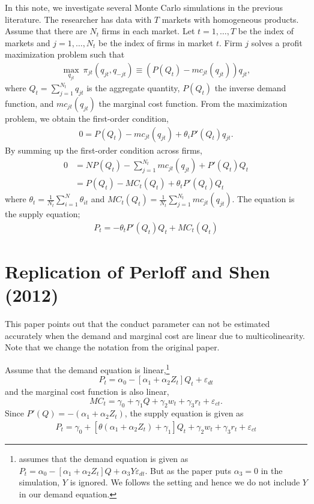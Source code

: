 \documentclass[11pt, a4paper]{article}
\numberwithin{figure}{section}
\theoremstyle{definition}
\newcommand{\0}{\mathbf{0}}
\begin{document}
In this note, we investigate several Monte Carlo simulations in the previous literature.
The researcher has data with $T$ markets with homogeneous products.
Assume that there are $N_t$ firms in each market.
Let $t = 1,\ldots, T$ be the index of markets and $j = 1, \ldots, N_t$ be the index of firms in market $t$.
Firm $j$ solves a profit maximization problem such that
\begin{align*}
    \max_{q_{jt}} \ \pi_{jt}(q_{jt}, q_{-jt}) \equiv (P(Q_t) - mc_{jt}(q_{jt}))q_{jt},
\end{align*}
where $Q_t = \sum_{j = 1}^{N_t} q_{jt}$ is the aggregate quantity, $P(Q_t)$ the inverse demand function, and $mc_{jt}(q_{jt})$ the marginal cost function.
From the maximization problem, we obtain the first-order condition,
\begin{align*}
    0 = P(Q_{t}) - mc_{jt}(q_{jt}) + \theta_i P'(Q_{t})q_{jt}.
\end{align*}
By summing up the first-order condition across firms, 
\begin{align*}
    0 &= NP(Q_t) - \sum_{j = 1}^{N_t} mc_{jt}(q_{jt}) + P'(Q_t)Q_{t}\\
    & =  P(Q_t) - MC_t(Q_t) + \theta_t P'(Q_t)Q_{t}
\end{align*}
where $\theta_t = \frac{1}{N_t}\sum_{i = 1}^N\theta_{it}$ and $MC_t(Q_t) = \frac{1}{N_{t}}\sum_{j = 1}^{N_t} mc_{jt}(q_{jt})$.
The equation is the supply equation;
\begin{align*}
    P_t = - \theta_t P'(Q_{t})Q_t + MC_t(Q_t)
\end{align*}


\section{Replication of Perloff and Shen (2012)}
This paper points out that the conduct parameter can not be estimated accurately when the demand and marginal cost are linear due to multicolinearity. Note that we change the notation from the original paper.

Assume that the demand equation is linear,\footnote{\citet{perloff2012collinearity} assumes that the demand equation is given as $P_t = \alpha_0 - [\alpha_1 + \alpha_2Z_t] Q +\alpha_3 Y \varepsilon_{dt}$. But as the paper puts $\alpha_3 =0$ in the simulation, $Y$ is ignored. We follows the setting and hence we do not include $Y$ in our demand equation.}
\[P_t = \alpha_0 - [\alpha_1 + \alpha_2Z_t] Q_t + \varepsilon_{dt}\]
and the marginal cost function is also linear, 
\[MC_t = \gamma_0  + \gamma_1 Q + \gamma_2 w_t + \gamma_3 r_t + \varepsilon_{ct}.\]
Since $P'(Q) = -(\alpha_1 + \alpha_2Z_t)$, the supply equation is given as
\begin{align*}
    P_t = \gamma_0 + [\theta(\alpha_1 + \alpha_2Z_t)+ \gamma_1] Q_t   + \gamma_2 w_t + \gamma_3 r_t + \varepsilon_{ct}
\end{align*}
\end{document}
